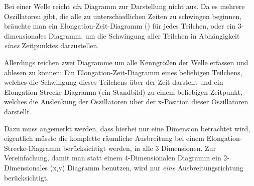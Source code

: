 Bei einer Welle reicht \emph{ein} Diagramm zur Darstellung nicht aus. Da es mehrere Oszillatoren gibt, die alle zu unterschiedlichen Zeiten zu schwingen beginnen, bräuchte man ein Elongation-Zeit-Diagramm () für jedes Teilchen, oder ein 3-dimensionales Diagramm, um die Schwingung aller Teilchen in Abhängigkeit \emph{eines} Zeitpunktes darzustellen.

Allerdings reichen zwei Diagramme um alle Kenngrößen der Welle erfassen und ablesen zu können: Ein Elongation-Zeit-Diagramm eines beliebigen Teilchens, welches die Schwingung dieses Teilchens über der Zeit darstellt und ein Elongation-Strecke-Diagramm (ein \glqq Standbild\grqq) zu einem beliebigen Zeitpunkt, welches die Auslenkung der Oszillatoren über der x-Position dieser Oszillatoren darstellt.


Dazu muss angemerkt werden, dass hierbei nur eine Dimension betrachtet wird, eigentlich müsste die komplette räumliche Ausbreitung bei einem Elongation-Strecke-Diagramm berücksichtigt werden, in alle 3 Dimensionen. Zur Vereinfachung, damit man statt einem 4-Dimensionalen Diagramm ein 2-Dimensionales (x,y) Diagramm benutzen, wird nur \emph{eine} Ausbreitungsrichtung berücksichtigt.
